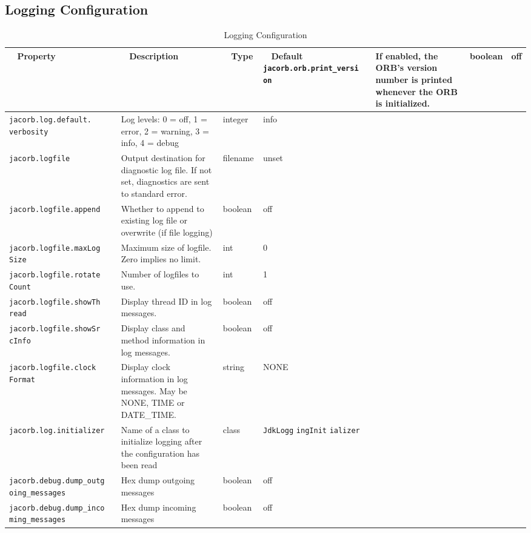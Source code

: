 \subsection{Logging Configuration}
\begin{small}
\begin{longtable}{|p{5cm}|p{7.5cm}|p{1.5cm}|p{1.5cm}|}
\caption{Logging Configuration}\\
\hline
~ \hfill \textbf {Property} \hfill ~ & ~ \hfill \textbf {Description}
\hfill ~ & ~ \hfill \textbf {Type} \hfill ~ & ~ \hfill
\textbf{Default} ~ \endhead
\hline
\verb"jacorb.orb.print_versi"
\verb"on" & If enabled, the ORB's version number is printed whenever
the ORB is initialized. & boolean & off \\
\hline
\verb"jacorb.log.default."
\verb"verbosity" & Log levels: 0 = off, 1 =
error, 2 = warning, 3 = info, 4 = debug & integer & info \\
\hline
\verb"jacorb.logfile" & Output destination for diagnostic log file. If
not set, diagnostics are sent to standard error.& filename & unset \\
\hline
\verb"jacorb.logfile.append" & Whether to append to
existing log file or overwrite (if file logging) & boolean & off \\
\hline
\verb"jacorb.logfile.maxLog"
\verb"Size" & Maximum size of logfile. Zero implies no limit. & int & 0 \\
\hline
\verb"jacorb.logfile.rotate"
\verb"Count" & Number of logfiles to use. & int & 1 \\
\hline
\verb"jacorb.logfile.showTh"
\verb"read" & Display thread ID in log messages. & boolean & off \\
\hline
\verb"jacorb.logfile.showSr"
\verb"cInfo" & Display class and method information in log messages. & boolean & off \\
\hline
\verb"jacorb.logfile.clock"
\verb"Format" & Display clock information in log messages. May be NONE, TIME or DATE\_TIME. & string & NONE \\
\hline
\verb"jacorb.log.initializer" & Name of a class to initialize logging
after the configuration has been read & class &
\verb"JdkLogg"
\verb"ingInit"
\verb"ializer" \\
\hline
\verb"jacorb.debug.dump_outg"
\verb"oing_messages" & Hex dump outgoing messages & boolean & off \\
\hline
\verb"jacorb.debug.dump_inco"
\verb"ming_messages" & Hex dump incoming messages & boolean & off \\
\hline
\end{longtable}
\end{small}


